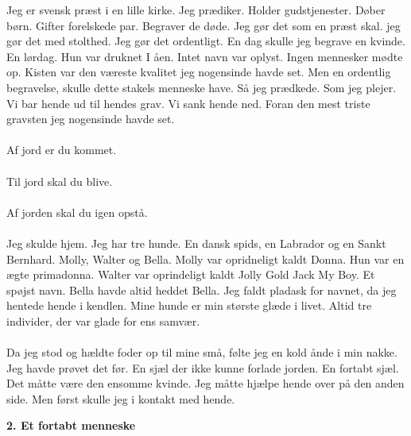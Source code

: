 \documentclass[]{article}
\begin{document}
Jeg er svensk præst i en lille kirke. Jeg prædiker. Holder gudstjenester. Døber børn. Gifter forelskede par. Begraver de døde. Jeg gør det som en præst skal. jeg gør det med stolthed. Jeg gør det ordentligt. En dag skulle jeg begrave en kvinde. En lørdag. Hun var druknet I åen. Intet navn var oplyst. Ingen mennesker mødte op. Kisten var den væreste kvalitet jeg nogensinde havde set. Men en ordentlig begravelse, skulle dette stakels menneske have. Så jeg prædkede. Som jeg plejer. Vi bar hende ud til hendes grav. Vi sank hende ned. Foran den mest triste gravsten jeg nogensinde havde set.
\\ \\
Af jord er du kommet.
\\ \\
Til jord skal du blive.
\\ \\
Af jorden skal du igen opstå.
\\ \\
Jeg skulde hjem. Jeg har tre hunde. En dansk spids, en Labrador og en Sankt Bernhard. Molly, Walter og Bella. Molly var opridneligt kaldt Donna. Hun var en ægte primadonna. Walter var oprindeligt kaldt Jolly Gold Jack My Boy. Et spøjst navn. Bella havde altid heddet Bella. Jeg faldt pladask for navnet, da jeg hentede hende i kendlen. Mine hunde er min største glæde i livet. Altid tre individer, der var glade for ens samvær. 
\\ \\
Da jeg stod og hældte foder op til mine små, følte jeg en kold ånde i min nakke. Jeg havde prøvet det før. En sjæl der ikke kunne forlade jorden. En fortabt sjæl. Det måtte være den ensomme kvinde. Jeg måtte hjælpe hende over på den anden side. Men først skulle jeg i kontakt med hende. 

\begin{center}
	\large\textbf{2. Et fortabt menneske}
\end{center}
\end{document}
